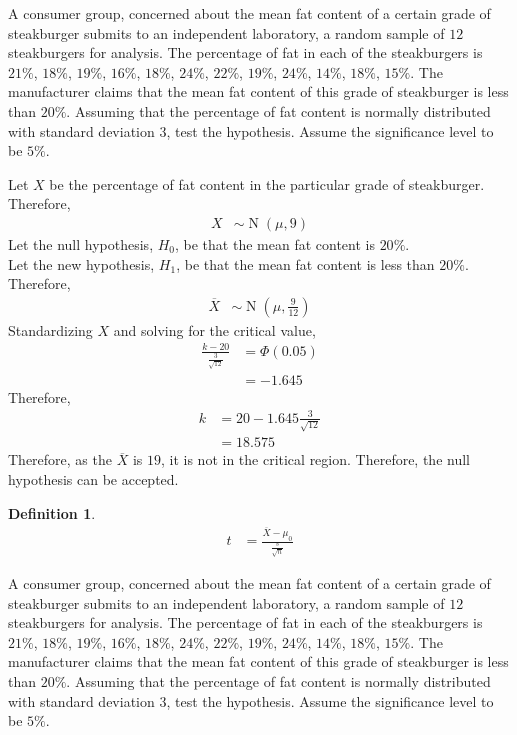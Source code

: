 \documentclass[titlepage, fleqn, a4paper, 12pt, twoside]{article}
\theoremstyle{definition}
\newtheorem{definition}{Definition}
\theoremstyle{theorem}
\DeclareMathOperator{\normal}{\mathrm{N}}
\begin{document}
\begin{question}
	A consumer group, concerned about the mean fat content of a certain grade of steakburger submits to an independent laboratory, a random sample of $12$ steakburgers for analysis.
	The percentage of fat in each of the steakburgers is $21\%$, $18\%$, $19\%$, $16\%$, $18\%$, $24\%$, $22\%$, $19\%$, $24\%$, $14\%$, $18\%$, $15\%$.
	The manufacturer claims that the mean fat content of this grade of steakburger is less than $20\%$.
	Assuming that the percentage of fat content is normally distributed with standard deviation $3$, test the hypothesis.
	Assume the significance level to be $5\%$.
\end{question}

\begin{solution}
	Let $X$ be the percentage of fat content in the particular grade of steakburger.\\
	Therefore,
	\begin{align*}
		X &\sim \normal(\mu, 9)
	\end{align*}
	Let the null hypothesis, $H_0$, be that the mean fat content is $20\%$.\\
	Let the new hypothesis, $H_1$, be that the mean fat content is less than $20\%$.\\
	Therefore,
	\begin{align*}
		\overline{X} &\sim \normal\left( \mu, \frac{9}{12} \right)
	\end{align*}
	Standardizing $X$ and solving for the critical value,
	\begin{align*}
		\frac{k - 20}{\frac{3}{\sqrt{12}}} &= \Phi(0.05)\\
		&= -1.645
	\end{align*}
	Therefore,
	\begin{align*}
		k &= 20 - 1.645 \frac{3}{\sqrt{12}}\\
		&= 18.575
	\end{align*}
	Therefore, as the $\overline{X}$ is $19$, it is not in the critical region.
	Therefore, the null hypothesis can be accepted.
\end{solution}


\begin{definition}
	\begin{align*}
		t &= \frac{\overline{X} - \mu_0}{\frac{s}{\sqrt{n}}}
	\end{align*}
\end{definition}

\begin{question}
	A consumer group, concerned about the mean fat content of a certain grade of steakburger submits to an independent laboratory, a random sample of $12$ steakburgers for analysis.
	The percentage of fat in each of the steakburgers is $21\%$, $18\%$, $19\%$, $16\%$, $18\%$, $24\%$, $22\%$, $19\%$, $24\%$, $14\%$, $18\%$, $15\%$.
	The manufacturer claims that the mean fat content of this grade of steakburger is less than $20\%$.
	Assuming that the percentage of fat content is normally distributed with standard deviation $3$, test the hypothesis.
	Assume the significance level to be $5\%$.
\end{question}
\end{document}
